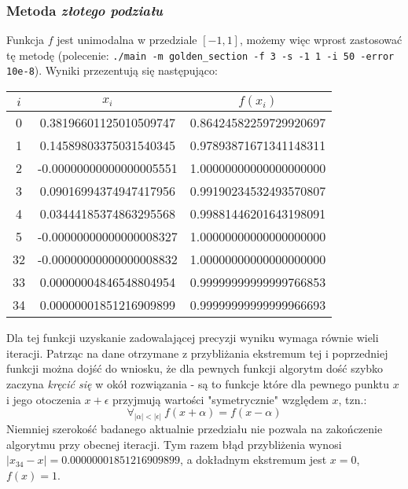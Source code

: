 \documentclass[a4paper,11pt]{article}
\begin{document}
    \subsubsection{Metoda \emph{złotego podziału}}
    Funkcja $ f $ jest unimodalna w przedziale $ [-1,1] $, możemy więc wprost zastosować tę metodę (polecenie: \texttt{./main -m golden\_section -f 3 -s -1 1 -i 50 -error 10e-8}). Wyniki przezentują się następująco:
      \begin{center}
      \begin{tabular}{S[table-format=1.0]S[table-format=-1.9]S[table-format=-1.15,table-auto-round=false]}
        \toprule
        {$i$}                & {$x_i$}               & {$f(x_i)$}            \\  & 0.38196601125010509747 & 0.86424582259729920697 \\
          1 & 0.14589803375031540345 & 0.97893871671341148311 \\
          2 & -0.00000000000000005551 & 1.00000000000000000000 \\
          3 & 0.09016994374947417956 & 0.99190234532493570807 \\
          4 & 0.03444185374863295568 & 0.99881446201643198091 \\
          5 & -0.00000000000000008327 & 1.00000000000000000000 \\
          32 & -0.00000000000000008832 & 1.00000000000000000000 \\
          33 & 0.00000004846548804954 & 0.99999999999999766853 \\
          34 & 0.00000001851216909899 & 0.99999999999999966693 \\ \bottomrule
        \end{tabular}
    \end{center}
    Dla tej funkcji uzyskanie zadowalającej precyzji wyniku wymaga równie wieli iteracji. Patrząc na dane otrzymane z przybliżania ekstremum tej i poprzedniej funkcji można dojść do wniosku, że dla pewnych funkcji algorytm dość szybko zaczyna \emph{kręcić się} w okół rozwiązania - są to funkcje które dla pewnego punktu $x$ i jego otoczenia $ x + \epsilon $ przyjmują wartości "symetrycznie" względem $x$, tzn.: $$ \forall_{|\alpha| < |\epsilon|} \: f(x + \alpha) = f(x - \alpha) $$ Niemniej szerokość badanego aktualnie przedziału nie pozwala na zakończenie algorytmu przy obecnej iteracji. Tym razem błąd przybliżenia wynosi $ |x_{34} - x| = 0.00000001851216909899 $, a dokładnym ekstremum jest $ x = 0 $, $ f(x) = 1$.
    
\end{document}
